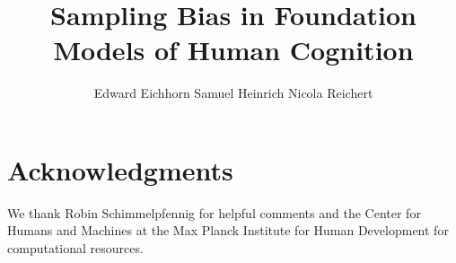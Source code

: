 \documentclass[11pt]{article}
\title{Sampling Bias in Foundation Models of Human Cognition}
\author{Edward Eichhorn \And Samuel Heinrich \And Nicola Reichert}
\begin{document}
\maketitle





\begin{abstract}

\end{abstract}




\section*{Acknowledgments} We thank Robin Schimmelpfennig for helpful comments and the Center for Humans and Machines at the Max Planck Institute for Human Development for computational resources. 


\appendix
\end{document}
